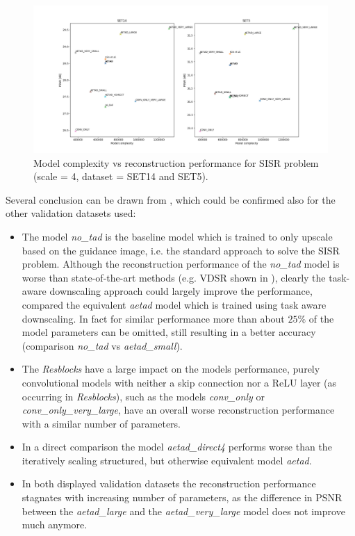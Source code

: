 \begin{figure}[!htbp]
	\centering
	\includegraphics[width=18cm]{figures/psnr_complexity_sisr}
	\caption{Model complexity vs reconstruction performance for \ac{SISR}
	problem (scale = 4, dataset = SET14 and SET5).}
  \label{fig:psnr_complexty_sisr}
\end{figure}

Several conclusion can be drawn from , which
could be confirmed also for the other validation datasets used:

\begin{itemize}
\item The model \textit{no\_tad} is the baseline model which is trained to
only upscale based on the guidance image, i.e. the standard approach to solve
the \ac{SISR} problem. Although the reconstruction performance of the
\textit{no\_tad} model is worse than state-of-the-art methods (e.g. VDSR
\cite{AISRUVDCN} shown in ), clearly the task-aware
downscaling approach could largely improve the performance, compared the equivalent
\textit{aetad} model which is trained using task aware downscaling. In fact
for similar performance more than about $25 \%$ of the model parameters can
be omitted, still resulting in a better accuracy (comparison \textit{no\_tad}
vs \textit{aetad\_small}).
\item The \textit{Resblocks} have a large impact on the models performance,
purely convolutional models with neither a skip connection nor a ReLU layer
(as occurring in \textit{Resblocks}), such as the models \textit{conv\_only} or
\textit{conv\_only\_very\_large}, have an overall worse reconstruction
performance with a similar number of parameters.
\item In a direct comparison the model \textit{aetad\_direct4} performs worse
than the iteratively scaling structured, but otherwise equivalent model
\textit{aetad}.
\item In both displayed validation datasets the reconstruction performance
stagnates with increasing number of parameters, as the difference in \ac{PSNR}
between the \textit{aetad\_large} and the \textit{aetad\_very\_large}
model does not improve much anymore.
\end{itemize}

